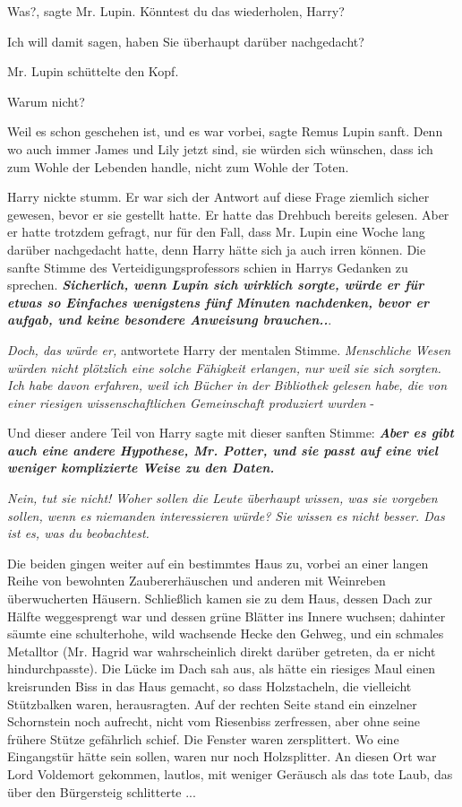 \glqq{}Was?\grqq{}, sagte Mr. Lupin. \glqq{}Könntest du das wiederholen,
Harry?\grqq{}

\glqq{}Ich will damit sagen, haben Sie überhaupt darüber nachgedacht?\grqq{}

Mr. Lupin schüttelte den Kopf.

\glqq{}Warum nicht?\grqq{}

\glqq{}Weil es schon geschehen ist, und es war vorbei\grqq{}, sagte Remus Lupin
sanft. \glqq{}Denn wo auch immer James und Lily jetzt sind, sie würden sich
wünschen, dass ich zum Wohle der Lebenden handle, nicht zum Wohle der
Toten.\grqq{}

Harry nickte stumm. Er war sich der Antwort auf diese Frage ziemlich sicher
gewesen, bevor er sie gestellt hatte. Er hatte das Drehbuch bereits gelesen.
Aber er hatte trotzdem gefragt, nur für den Fall, dass Mr. Lupin eine Woche lang
darüber nachgedacht hatte, denn Harry hätte sich ja auch irren können. Die
sanfte Stimme des Verteidigungsprofessors schien in Harrys Gedanken zu sprechen.
\textbf{\emph{Sicherlich, wenn Lupin sich wirklich sorgte, würde er für etwas so
Einfaches wenigstens fünf Minuten nachdenken, bevor er aufgab, und keine
besondere Anweisung brauchen..}}.

\emph{Doch, das würde er,} antwortete Harry der mentalen Stimme.
\emph{Menschliche Wesen würden nicht plötzlich eine solche Fähigkeit erlangen,
nur weil sie sich sorgten. Ich habe davon erfahren, weil ich Bücher in der
Bibliothek gelesen habe, die von einer riesigen wissenschaftlichen Gemeinschaft
produziert wurden} -

Und dieser andere Teil von Harry sagte mit dieser sanften Stimme:
\textbf{\emph{Aber es gibt auch eine andere Hypothese, Mr. Potter, und sie passt
auf eine viel weniger komplizierte Weise zu den Daten.}}

\emph{Nein, tut sie nicht! Woher sollen die Leute überhaupt wissen, was sie
vorgeben sollen, wenn es niemanden interessieren würde? Sie wissen es nicht
besser. Das ist es, was du beobachtest.}

Die beiden gingen weiter auf ein bestimmtes Haus zu, vorbei an einer langen
Reihe von bewohnten Zaubererhäuschen und anderen mit Weinreben überwucherten
Häusern. Schließlich kamen sie zu dem Haus, dessen Dach zur Hälfte weggesprengt
war und dessen grüne Blätter ins Innere wuchsen; dahinter säumte eine
schulterhohe, wild wachsende Hecke den Gehweg, und ein schmales Metalltor (Mr.
Hagrid war wahrscheinlich direkt darüber getreten, da er nicht hindurchpasste).
Die Lücke im Dach sah aus, als hätte ein riesiges Maul einen kreisrunden Biss in
das Haus gemacht, so dass Holzstacheln, die vielleicht Stützbalken waren,
herausragten. Auf der rechten Seite stand ein einzelner Schornstein noch
aufrecht, nicht vom Riesenbiss zerfressen, aber ohne seine frühere Stütze
gefährlich schief. Die Fenster waren zersplittert. Wo eine Eingangstür hätte
sein sollen, waren nur noch Holzsplitter. An diesen Ort war Lord Voldemort
gekommen, lautlos, mit weniger Geräusch als das tote Laub, das über den
Bürgersteig schlitterte ...


